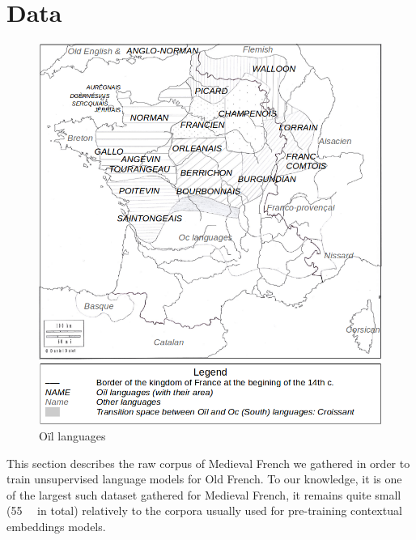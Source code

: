 
\section{Data}\label{sec-data}

\begin{figure}[thb]
    \centering
    \includegraphics[scale=0.29]{static/media/models/bertrade/map-dialects2.png}
    \caption{Oïl languages}
    \label{fig:map-dialects}
\end{figure}

This section describes the raw corpus of Medieval French we gathered in order to train unsupervised language models for Old French.
To our knowledge, it is one of the largest such dataset gathered for Medieval French, it remains quite small (\SI{55}{\mebi\byte} in total) relatively to the corpora usually used for pre-training contextual embeddings models.

